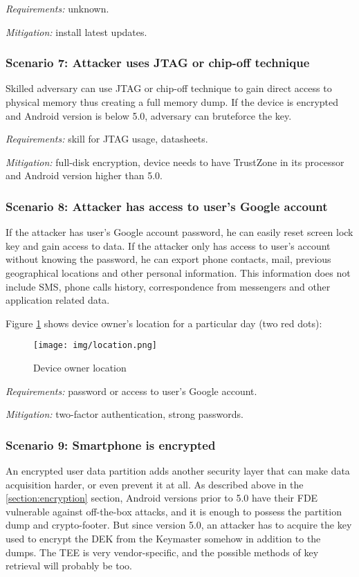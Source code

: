 \textsl{Requirements:} unknown.

\textsl{Mitigation:} install latest updates.

\subsubsection{Scenario 7: Attacker uses JTAG or chip-off technique}

Skilled adversary can use JTAG or chip-off technique to gain direct access to physical memory thus creating a full memory dump. If the device is encrypted and Android version is below 5.0, adversary can bruteforce the key.


\textsl{Requirements:} skill for JTAG usage, datasheets.

\textsl{Mitigation:} full-disk encryption, device needs to have TrustZone in its processor and Android version higher than 5.0.


\subsubsection{Scenario 8: Attacker has access to user’s Google account}

If the attacker has user’s Google account password, he can easily reset screen lock key and gain access to data. If the attacker only has access to user’s account without knowing the password, he can export phone contacts, mail, previous geographical locations and other personal information. This information does not include SMS, phone calls history,  correspondence from messengers and other application related data.

Figure \ref{pic:location} shows device owner’s location for a particular day (two red dots):

\begin{figure}[!ht]
\centering
\texttt{[image: img/location.png]}
\caption{Device owner location}
\label{pic:location}
\end{figure}

\textsl{Requirements:} password or access to user’s Google account.

\textsl{Mitigation:} two-factor authentication, strong passwords.


\subsubsection{Scenario 9: Smartphone is encrypted}

An encrypted user data partition adds another security layer that can make data acquisition harder, or even prevent it at all. As described above in the \ref{section:encryption} section, Android versions prior to 5.0 have their FDE vulnerable against off-the-box attacks, and it is enough to possess the partition dump and crypto-footer. But since version 5.0, an attacker has to acquire the key used to encrypt the DEK from the Keymaster somehow in addition to the dumps. The TEE is very vendor-specific, and the possible methods of key retrieval will probably be too. 

